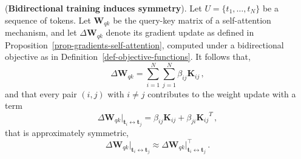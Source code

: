 \begin{theorem}
\label{theo-gradients-symmetry}
%
(\textbf{Bidirectional training induces symmetry}).
%
Let $U = \{t_1, \dots, t_N\}$ be a sequence of tokens.
%
Let \( \bm{W}_{qk} \) be the query-key matrix of a self-attention mechanism, and let \( \Delta \bm{W}_{qk} \) denote its gradient update as defined in Proposition~\ref{prop-gradients-self-attention}, computed under a bidirectional objective as in Definition~\ref{def-objective-functions}.
%
It follows that,
%
\begin{equation}
    \Delta \bm{W}_{qk} = \sum_{i = 1}^N \sum_{j = 1}^N \beta_{ij} \bm{K}_{ij} \,,
\end{equation}
%
and that every pair $(i,j)$ with $i \neq j$ contributes to the weight update with a term
%
\begin{equation}
    \Delta \bm{W}_{qk}\big|_{\bm{t}_i \leftrightarrow \bm{t}_j} = \beta_{ij}\bm{K}_{ij} + \beta_{ji}{\bm{K}_{ij}}^T \,,
\end{equation}
%
that is approximately symmetric,
%
\begin{equation}
    \Delta \bm{W}_{qk}\big|_{\bm{t}_i \leftrightarrow \bm{t}_j} \approx \Delta \bm{W}_{qk}\big|^\top_{\bm{t}_i \leftrightarrow \bm{t}_j} \,.
\end{equation}
%
\end{theorem}